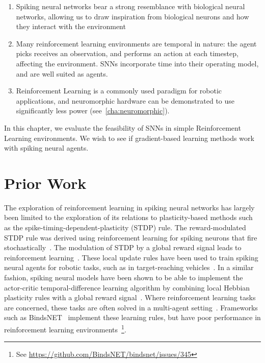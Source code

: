 \documentclass[fyp]{socreport}
\begin{document}
\begin{enumerate}
  \item Spiking neural networks bear a strong resemblance with biological neural
    networks, allowing us to draw inspiration from biological neurons and how
    they interact with the environment
  \item Many reinforcement learning environments are temporal in nature: the
    agent picks receives an observation, and performs an action at each
    timestep, affecting the environment. SNNs incorporate time into their
    operating model, and are well suited as agents.
  \item Reinforcement Learning is a commonly used paradigm for robotic
    applications, and neuromorphic hardware can be demonstrated to use
    significantly less power (see~\autoref{cha:neuromorphic}).
\end{enumerate}

In this chapter, we evaluate the feasibility of SNNs in simple Reinforcement
Learning environments. We wish to see if gradient-based learning methods work
with spiking neural agents.

\section{Prior Work}

The exploration of reinforcement learning in spiking neural networks has largely
been limited to the exploration of its relations to plasticity-based methods
such as the spike-timing-dependent-plasticity (STDP) rule. The reward-modulated
STDP rule was derived using reinforcement learning for spiking neurons that fire
stochastically~\cite{florian2005}. The modulation of STDP by a global reward
signal leads to reinforcement
learning~\cite{florian07_reinf_learn_throug_modul_spike,baras07_reinf_learn_spike_time_depen}.
These local update rules have been used to train spiking neural agents for
robotic tasks, such as in target-reaching
vehicles~\cite{10.3389/fnbot.2019.00018}. In a similar fashion, spiking neural
models have been shown to be able to implement the actor-critic
temporal-difference learning algorithm by combining local Hebbian plasticity
rules with a global reward
signal~\cite{potjans09_spikin_neural_networ_model_actor}. Where reinforcement
learning tasks are concerned, these tasks are often solved in a multi-agent
setting~\cite{VITANZA20153122,aenugu19_reinf_learn_with_spikin_coagen}.
Frameworks such as BindsNET~\cite{10.3389/fninf.2018.00089} implement these
learning rules, but have poor performance in reinforcement learning
environments~\footnote{See
  \url{https://github.com/BindsNET/bindsnet/issues/345}}.
\end{document}
